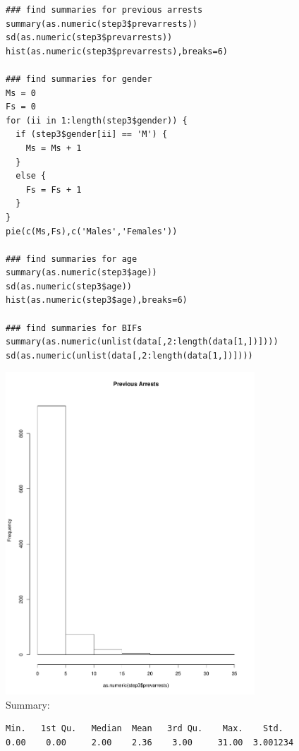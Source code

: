 \documentclass{article}
\begin{document}
\begin{verbatim}
### find summaries for previous arrests
summary(as.numeric(step3$prevarrests))
sd(as.numeric(step3$prevarrests))
hist(as.numeric(step3$prevarrests),breaks=6)

### find summaries for gender
Ms = 0
Fs = 0
for (ii in 1:length(step3$gender)) {
  if (step3$gender[ii] == 'M') {
    Ms = Ms + 1
  }
  else {
    Fs = Fs + 1
  }
}
pie(c(Ms,Fs),c('Males','Females'))

### find summaries for age
summary(as.numeric(step3$age))
sd(as.numeric(step3$age))
hist(as.numeric(step3$age),breaks=6)

### find summaries for BIFs
summary(as.numeric(unlist(data[,2:length(data[1,])])))
sd(as.numeric(unlist(data[,2:length(data[1,])])))
\end{verbatim}
\includegraphics[width=0.7\textwidth]{PrevArrests.pdf}\\
Summary:\\
\begin{verbatim}
Min.   1st Qu.   Median  Mean   3rd Qu.    Max.    Std.
0.00    0.00     2.00    2.36    3.00     31.00  3.001234
\end{verbatim}
\end{document}
